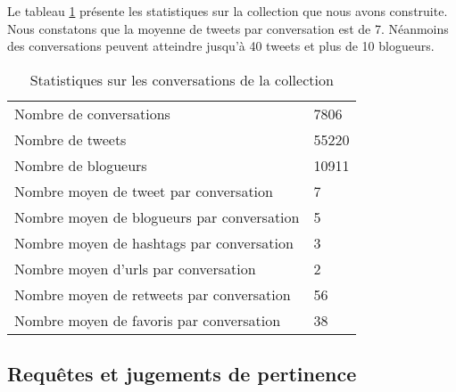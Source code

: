 \documentclass{article-hermes}
\begin{document}
\par Le tableau \ref{tab:statistique} présente les statistiques sur la collection que nous avons construite. Nous constatons que la moyenne de tweets par conversation est de 7. Néanmoins des conversations peuvent atteindre jusqu'à 40 tweets et plus de 10 blogueurs. 
\begin{table}[htb]
\center
\caption{\label{tab:statistique}Statistiques sur les conversations de la collection}
\begin{tabular}{|l|l|}
  \hline
 Nombre de conversations & 7806\\
 Nombre de tweets & 55220\\
 Nombre de blogueurs & 10911\\
 Nombre moyen de tweet par conversation & 7 \\
 Nombre moyen de blogueurs par conversation & 5 \\
 Nombre moyen de hashtags par conversation & 3\\
 Nombre moyen d'urls par conversation   & 2\\
 Nombre moyen de retweets par conversation & 56 \\
 Nombre moyen de favoris par conversation & 38 \\
  \hline
\end{tabular}
\end{table}

\subsection{Requêtes et jugements de pertinence}
\end{document}
